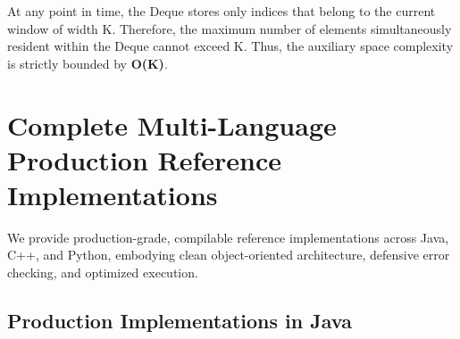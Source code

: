 \documentclass[10pt,journal,compsoc,onecolumn]{IEEEtran}
\begin{document}
At any point in time, the Deque stores only indices that belong to the current window of width K. Therefore, the maximum number of elements simultaneously resident within the Deque cannot exceed K. Thus, the auxiliary space complexity is strictly bounded by \textbf{O(K)}.

\section{Complete Multi-Language Production Reference Implementations}
\label{sec:implementations}

We provide production-grade, compilable reference implementations across Java, C++, and Python, embodying clean object-oriented architecture, defensive error checking, and optimized execution.

\subsection{Production Implementations in Java}
\end{document}
